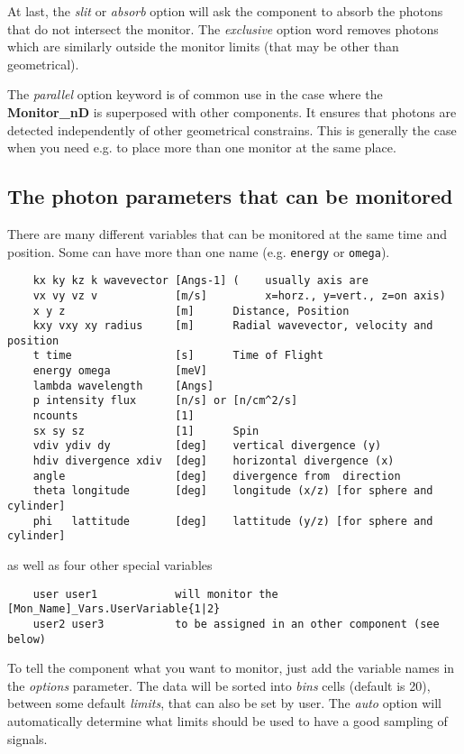 At last, the \textit{slit} or \textit{absorb} option will ask the component to
absorb the photons that do not intersect the monitor. The \textit{exclusive} option word removes photons which are similarly outside the monitor limits (that may be other than geometrical).

The \textit{parallel} option keyword is of common use in the case where the \textbf{Monitor\_nD} is superposed with other components. It ensures that photons are detected independently of other geometrical constrains. This is generally the case when you need e.g. to place more than one monitor at the same place.

\subsection{The photon parameters that can be monitored}

There are many different variables that can be monitored at the same time
and position. Some can have more than one name (e.g. \texttt{energy} or
\texttt{omega}).


\begin{lstlisting}
    kx ky kz k wavevector [Angs-1] (    usually axis are
    vx vy vz v            [m/s]         x=horz., y=vert., z=on axis)
    x y z                 [m]      Distance, Position
    kxy vxy xy radius     [m]      Radial wavevector, velocity and position
    t time                [s]      Time of Flight
    energy omega          [meV]
    lambda wavelength     [Angs]
    p intensity flux      [n/s] or [n/cm^2/s]
    ncounts               [1]
    sx sy sz              [1]      Spin
    vdiv ydiv dy          [deg]    vertical divergence (y)
    hdiv divergence xdiv  [deg]    horizontal divergence (x)
    angle                 [deg]    divergence from  direction
    theta longitude       [deg]    longitude (x/z) [for sphere and cylinder]
    phi   lattitude       [deg]    lattitude (y/z) [for sphere and cylinder]
\end{lstlisting}
as well as four other special variables
\begin{lstlisting}
    user user1            will monitor the [Mon_Name]_Vars.UserVariable{1|2}
    user2 user3           to be assigned in an other component (see below)
\end{lstlisting}

To tell the component what you want to monitor, just add the variable
names in the \textit{options} parameter. The data will be sorted into \textit{
  bins} cells (default is 20), between some default \textit{limits}, that
can also be set by user. The \textit{auto} option will automatically
determine what limits should be used to have a good sampling of signals.

